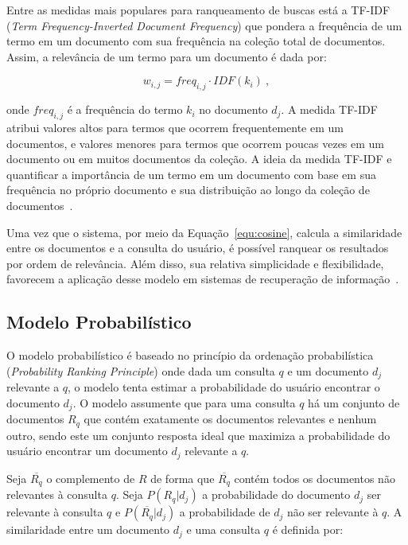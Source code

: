Entre as medidas mais populares para ranqueamento de buscas está a TF-IDF (\textit{Term Frequency-Inverted Document Frequency}) que pondera a frequência de um termo em um documento com sua frequência na coleção total de documentos. Assim, a relevância de um termo para um documento é dada por:

\begin{equation}
	w_{i,j} = freq_{i,j} \cdot IDF(k_i)~,
\end{equation}


\noindent
onde $freq_{i,j}$ é a frequência do termo $k_i$ no documento $d_j$. A medida TF-IDF atribui valores altos para termos que ocorrem frequentemente em um documentos, e valores menores para termos que ocorrem poucas vezes em um documento ou em muitos documentos da coleção. A ideia da medida TF-IDF e quantificar a importância de um termo em um documento com base em sua frequência no próprio documento e sua distribuição ao longo da coleção de documentos~\cite{Croft2009,Salton1988,Shamsinejadbabki2012,Salton:1994}.


Uma vez que o sistema, por meio da Equação~\ref{equ:cosine}, calcula a similaridade entre os documentos e a consulta do usuário, é possível ranquear os resultados por ordem de relevância. Além disso, sua relativa simplicidade e flexibilidade, favorecem a aplicação desse modelo em sistemas de recuperação de informação~\cite{Tan2005,Croft2009,Manning2008}.



\subsection{Modelo Probabilístico}

 
O modelo probabilístico é baseado no princípio da ordenação probabilística (\textit{Probability Ranking Principle}) onde dada um consulta $q$ e um documento $d_j$ relevante a $q$, o modelo tenta estimar a probabilidade do usuário encontrar o documento $d_j$. O modelo assumente que para uma consulta $q$ há um conjunto de documentos $R_q$ que contém exatamente os documentos relevantes e nenhum outro, sendo este um conjunto resposta ideal que maximiza a probabilidade do usuário encontrar um documento $d_j$ relevante a $q$. 

Seja $\overline{R_q}$ o complemento de $R$ de forma que $\overline{R_q}$ contém todos os documentos não relevantes à consulta $q$. Seja $P(R_q|d_j)$ a probabilidade do documento $d_j$ ser relevante à consulta $q$ e $P(\overline{R_q}|d_j)$ a probabilidade de $d_j$ não ser relevante à $q$. A similaridade entre um documento $d_j$ e uma consulta $q$ é definida por:





